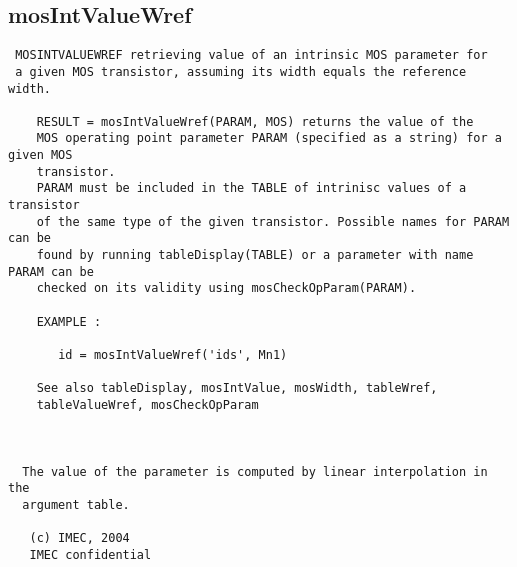 \newpage
\subsection{mosIntValueWref}
\label{sec:mosIntValueWref}
\begin{verbatim}
 MOSINTVALUEWREF retrieving value of an intrinsic MOS parameter for 
 a given MOS transistor, assuming its width equals the reference width.
                                                                           
    RESULT = mosIntValueWref(PARAM, MOS) returns the value of the 
    MOS operating point parameter PARAM (specified as a string) for a given MOS
    transistor.   
    PARAM must be included in the TABLE of intrinisc values of a transistor
    of the same type of the given transistor. Possible names for PARAM can be
    found by running tableDisplay(TABLE) or a parameter with name PARAM can be
    checked on its validity using mosCheckOpParam(PARAM).
 
    EXAMPLE :                                                                
 
       id = mosIntValueWref('ids', Mn1)                            
   
    See also tableDisplay, mosIntValue, mosWidth, tableWref,
    tableValueWref, mosCheckOpParam
    
 
 
  The value of the parameter is computed by linear interpolation in the 
  argument table.
 
   (c) IMEC, 2004
   IMEC confidential 
 

\end{verbatim}

\newpage
